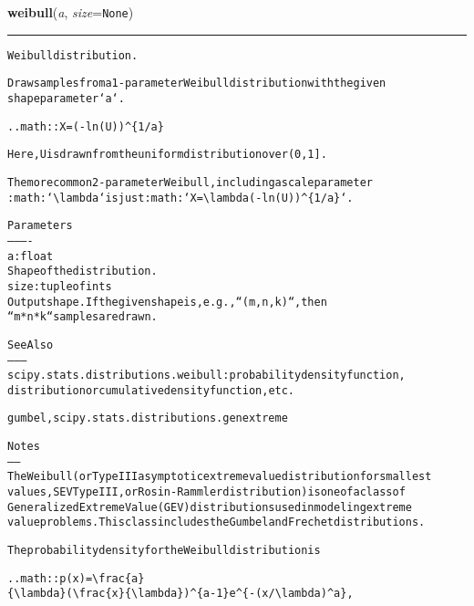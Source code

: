     \label{QSTK:qstklearn:mldiagnostics:weibull}

    \vspace{0.5ex}

\hspace{.8\funcindent}\begin{boxedminipage}{\funcwidth}

    \raggedright \textbf{weibull}(\textit{a}, \textit{size}={\tt None})

    \vspace{-1.5ex}

    \rule{\textwidth}{0.5\fboxrule}
\setlength{\parskip}{2ex}
\begin{alltt}
Weibull distribution.

Draw samples from a 1-parameter Weibull distribution with the given
shape parameter `a`.

.. math:: X = (-ln(U)){\textasciicircum}\{1/a\}

Here, U is drawn from the uniform distribution over (0,1].

The more common 2-parameter Weibull, including a scale parameter
:math:`{\textbackslash}lambda` is just :math:`X = {\textbackslash}lambda(-ln(U)){\textasciicircum}\{1/a\}`.

Parameters
----------
a : float
    Shape of the distribution.
size : tuple of ints
    Output shape.  If the given shape is, e.g., ``(m, n, k)``, then
    ``m * n * k`` samples are drawn.

See Also
--------
scipy.stats.distributions.weibull : probability density function,
    distribution or cumulative density function, etc.

gumbel, scipy.stats.distributions.genextreme

Notes
-----
The Weibull (or Type III asymptotic extreme value distribution for smallest
values, SEV Type III, or Rosin-Rammler distribution) is one of a class of
Generalized Extreme Value (GEV) distributions used in modeling extreme
value problems.  This class includes the Gumbel and Frechet distributions.

The probability density for the Weibull distribution is

.. math:: p(x) = {\textbackslash}frac\{a\}
                 \{{\textbackslash}lambda\}({\textbackslash}frac\{x\}\{{\textbackslash}lambda\}){\textasciicircum}\{a-1\}e{\textasciicircum}\{-(x/{\textbackslash}lambda){\textasciicircum}a\},


\end{alltt}
\end{boxedminipage}
